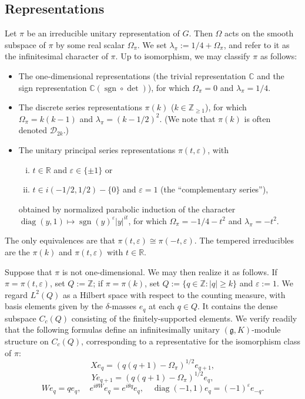 \documentclass[reqno,10pt]{amsart}
\theoremstyle{plain} %
\theoremstyle{definition}
\theoremstyle{plain} %
\theoremstyle{remark}
\theoremstyle{itplain} %
\theoremstyle{remark} %
\renewcommand{\geq}{\geqslant}
\numberwithin{equation}{section}
\DeclareMathOperator{\sgn}{sgn}
\def\eps{\varepsilon}
\DeclareMathOperator{\diag}{diag}
\begin{document}
\subsection{Representations}\label{sec:prelims-representations}
Let $\pi$ be an irreducible unitary representation of $G$.  Then $\Omega$ acts on the smooth subspace of $\pi$ by some real scalar $\Omega_{\pi}$.  We set $\lambda_\pi := 1/4 + \Omega_\pi$, and refer to it as the infinitesimal character of $\pi$.  Up to isomorphism, we may classify $\pi$ as follows:
\begin{itemize}
\item The one-dimensional representations (the trivial representation $\mathbb{C}$ and the sign representation $\mathbb{C} (\sgn \circ \det)$), for which $\Omega_\pi = 0$ and $\lambda_\pi = 1/4$.
\item The discrete series representations $\pi(k)$ ($k \in \mathbb{Z}_{\geq 1}$), for which $\Omega_\pi = k(k-1)$ and $\lambda_\pi = (k-1/2)^2$.  (We note that $\pi(k)$ is often denoted $\mathcal{D}_{2k}$.)
\item The unitary principal series representations $\pi(t,\eps)$, with
  \begin{enumerate}[(i)]
  \item $t \in \mathbb{R}$ and $\eps \in \{\pm 1\}$ or
  \item $t \in i(-1/2,1/2) - \{0\}$ and $\eps = 1$ (the ``complementary series''),
  \end{enumerate}
  obtained by normalized parabolic induction of the character $\diag(y,1) \mapsto \sgn(y)^\eps |y|^{i t}$, for which $\Omega_\pi = -1/4 - t^2$ and $\lambda_\pi = - t^2$.
\end{itemize}
The only equivalences are that $\pi(t,\eps) \cong \pi(-t,\eps)$.  The tempered irreducibles are the $\pi(k)$ and $\pi(t,\eps)$ with $t \in \mathbb{R}$.

Suppose that $\pi$ is not one-dimensional.  We may then realize it as follows.  If $\pi = \pi(t,\eps)$, set $Q := \mathbb{Z}$; if $\pi = \pi(k)$, set $Q := \{q \in \mathbb{Z} : |q| \geq k\}$ and $\eps := 1$.  We regard $L^2(Q)$ as a Hilbert space with respect to the counting measure, with basis elements given by the $\delta$-masses $e_q$ at each $q \in Q$.  It contains the dense subspace $C_c(Q)$ consisting of the finitely-supported elements.  We verify readily that the following formulas define an infinitesimally unitary $(\mathfrak{g},K)$-module structure on $C_c(Q)$, corresponding to a representative for the isomorphism class of $\pi$:
\begin{equation*}
  X e_q = ( q(q+1) - \Omega_\pi)^{1/2} e_{q+1},
\end{equation*}
\[
  Y e_{q+1} = (q(q+1) - \Omega_\pi)^{1/2} e_{q},
\]
\[
  W e_q = q e_q, \quad e^{i \theta W} e_q = e^{i \theta q} e_q, \quad \diag(-1,1) e_q = (-1)^{\eps} e_{-q}.
\]
\end{document}

